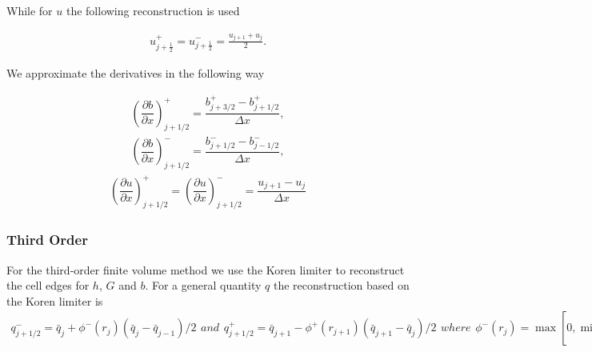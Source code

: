 While for $u$ the following reconstruction is used

\begin{gather}
u^+_{j + \frac{1}{2}} = u^-_{j + \frac{1}{2}} = \frac{u_{j+1} + u_j}{2}.
\end{gather}

We approximate the derivatives in the following way

\begin{gather}
\left( \dfrac{\partial b}{\partial x}\right)^+_{j+1/2} =\dfrac { {b}^+_{j+3/2} - {b}^+_{j+1/2} }{\Delta x},
\end{gather}
\begin{gather}
\left( \dfrac{\partial b}{\partial x}\right)^-_{j+1/2} = \dfrac{{b}^-_{j+1/2} - {b}^-_{j-1/2} }{\Delta x},
\end{gather}
\begin{gather}
\left( \dfrac{\partial u}{\partial x}\right)^+_{j+1/2} = \left( \dfrac{\partial u}{\partial x}\right)^-_{j+1/2} =\dfrac{ {u_{j+1} - u_{j}} }{\Delta x}
\end{gather}

\subsubsection{Third Order}
For the third-order finite volume method we use the Koren limiter \cite{Koren-B-1993} to reconstruct the cell edges for $h$, $G$ and $b$. For a general quantity $q$ the reconstruction based on the Koren limiter is
\begin{subequations}
	\begin{gather}
	q^-_{j + 1/2} = \bar{q}_j +  \phi^- \left( r_j \right)\left(\bar{q}_j -\bar{q}_{j-1} \right)/2
	\end{gather}
	and
	\begin{gather}
	q^+_{j + 1/2} = \bar{q}_{j+1} - \phi^+ \left(r_{j+1} \right) \left(\bar{q}_{j+1} -\bar{q}_j \right)/2
	\end{gather}
	where
	\begin{gather}
	\phi^-\left(r_j\right) = \max\left[0, \min\left[2 r_j, \dfrac{1 + 2r_j}{3},2\right]\right],
	\end{gather}
	\begin{gather}
	\phi^+\left(r_j\right) = \max\left[0, \min\left[2 r_j, \dfrac{2 + r_j}{3},2\right]\right]
	\end{gather}
	with
	\begin{equation}
	r_j = (\bar{q}_{j+1} - \bar{q}_j )/(\bar{q}_j - \bar{q}_{j-1}).
	\end{equation}
\end{subequations}

